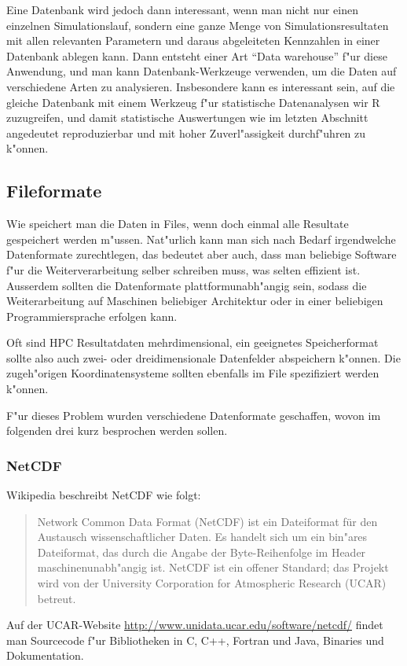 Eine Datenbank wird jedoch dann interessant, wenn man nicht nur einen
einzelnen Simulationslauf, sondern eine ganze Menge von Simulationsresultaten
mit allen relevanten Parametern und daraus abgeleiteten Kennzahlen
in einer Datenbank ablegen kann.
Dann entsteht einer Art ``Data warehouse'' f"ur diese Anwendung,
und man kann Datenbank-Werkzeuge verwenden, um die Daten auf
verschiedene Arten zu analysieren. 
Insbesondere kann es interessant sein, auf die gleiche Datenbank
mit einem Werkzeug f"ur statistische Datenanalysen wir R zuzugreifen,
und damit statistische Auswertungen wie im letzten Abschnitt
angedeutet reproduzierbar und mit hoher Zuverl"assigkeit durchf"uhren
zu k"onnen.

\subsection{Fileformate}
Wie speichert man die Daten in Files, wenn doch einmal alle Resultate
gespeichert werden m"ussen.
Nat"urlich kann man sich nach Bedarf irgendwelche Datenformate zurechtlegen,
das bedeutet aber auch, dass man beliebige Software f"ur die
Weiterverarbeitung selber schreiben muss, was selten effizient ist.
Ausserdem sollten die Datenformate plattformunabh"angig sein,
sodass die Weiterarbeitung auf Maschinen beliebiger Architektur
oder in einer beliebigen Programmiersprache erfolgen kann.

Oft sind HPC Resultatdaten mehrdimensional, ein geeignetes Speicherformat
sollte also auch zwei- oder dreidimensionale Datenfelder abspeichern
k"onnen.
Die zugeh"origen Koordinatensysteme sollten ebenfalls im File
spezifiziert werden k"onnen.

F"ur dieses Problem wurden verschiedene Datenformate geschaffen, 
wovon im folgenden drei kurz besprochen werden sollen.

\subsubsection{NetCDF}
Wikipedia beschreibt NetCDF wie folgt:
\begin{quote}
Network Common Data Format (NetCDF) ist ein Dateiformat für den
Austausch wissenschaftlicher Daten. Es handelt sich um ein bin"ares
Dateiformat, das durch die Angabe der Byte-Reihenfolge im Header
maschinenunabh"angig ist. NetCDF ist ein offener Standard; das Projekt
wird von der University Corporation for Atmospheric Research (UCAR)
betreut.
\end{quote}
Auf der UCAR-Website \url{http://www.unidata.ucar.edu/software/netcdf/}
findet man Sourcecode f"ur Bibliotheken in C, C++, Fortran und Java,
Binaries und Dokumentation. 

